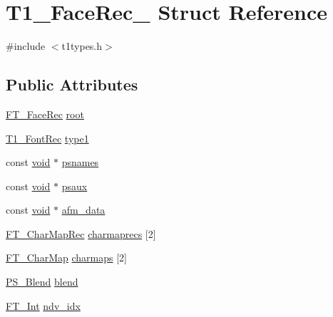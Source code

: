 \hypertarget{struct_t1___face_rec__}{\section{T1\-\_\-\-Face\-Rec\-\_\- Struct Reference}
\label{struct_t1___face_rec__}
}


{\ttfamily \#include $<$t1types.\-h$>$}

\subsection*{Public Attributes}
\begin{DoxyCompactItemize}
\item 
\hyperlink{freetype_8h_a530156fe5441077746e672987881526c}{F\-T\-\_\-\-Face\-Rec} \hyperlink{struct_t1___face_rec___a43be05c1ded91ee98e851f285b97f2e8}{root}
\item 
\hyperlink{t1types_8h_aa4019030bd0d59a9154ade639df952af}{T1\-\_\-\-Font\-Rec} \hyperlink{struct_t1___face_rec___aa1b8f09752d662d2dca26ed8bc00d782}{type1}
\item 
const \hyperlink{wglew_8h_aeea6e3dfae3acf232096f57d2d57f084}{void} $\ast$ \hyperlink{struct_t1___face_rec___ad685d33071eb00bfe3c9b7d3b91f7405}{psnames}
\item 
const \hyperlink{wglew_8h_aeea6e3dfae3acf232096f57d2d57f084}{void} $\ast$ \hyperlink{struct_t1___face_rec___a33673d6f5c7f690a45e59f79dbf9c77f}{psaux}
\item 
const \hyperlink{wglew_8h_aeea6e3dfae3acf232096f57d2d57f084}{void} $\ast$ \hyperlink{struct_t1___face_rec___afbaa364af232b37ec67dec7c99db773c}{afm\-\_\-data}
\item 
\hyperlink{freetype_8h_ad92f7574a10b500314a39fc55aa7e9e8}{F\-T\-\_\-\-Char\-Map\-Rec} \hyperlink{struct_t1___face_rec___a017b1eee73523b188e6d2a25881d6852}{charmaprecs} \mbox{[}2\mbox{]}
\item 
\hyperlink{freetype_8h_afc4717ddfd456a38ee15ec9c88fc7dac}{F\-T\-\_\-\-Char\-Map} \hyperlink{struct_t1___face_rec___a1e9ad3418fbff6b1594db5beddd9b5a8}{charmaps} \mbox{[}2\mbox{]}
\item 
\hyperlink{t1tables_8h_aa6585837cd3e553b7c3d969f8afc3b17}{P\-S\-\_\-\-Blend} \hyperlink{struct_t1___face_rec___a51e4e76f9988ec601d1fec6b5d4611db}{blend}
\item 
\hyperlink{fttypes_8h_af90e5fb0d07e21be9fe6faa33f02484c}{F\-T\-\_\-\-Int} \hyperlink{struct_t1___face_rec___a0ecadea7618642ccc351f81ac56ec266}{ndv\-\_\-idx}
\item 

\end{DoxyCompactItemize}
